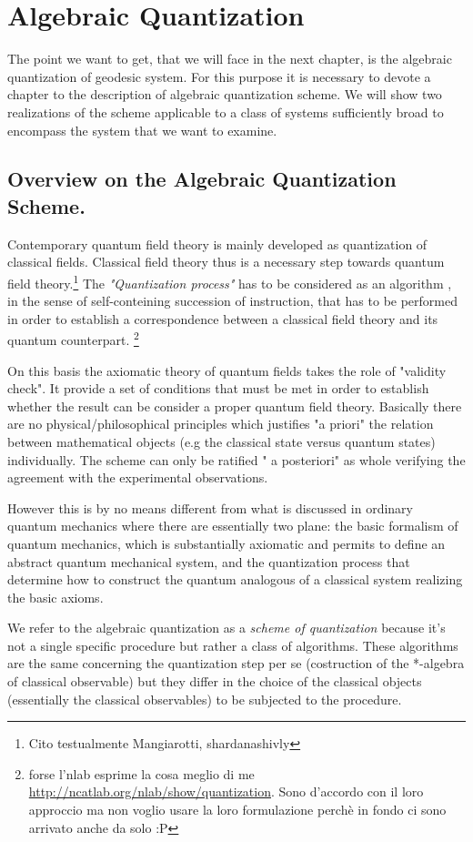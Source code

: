 \documentclass[Main]{subfiles}
\begin{document}
\chapter{Algebraic Quantization}
The point we want to get, that we will face in the next chapter, is the algebraic quantization of geodesic system.
For this purpose it is necessary to devote a chapter to the description of algebraic quantization scheme.
We will show two realizations of the scheme applicable to a class of systems sufficiently broad to encompass the system that we want to examine.

\section{Overview on the Algebraic Quantization Scheme.}
Contemporary quantum field theory is mainly developed as quantization of classical fields. Classical field theory thus is a necessary step towards quantum field theory.\danger \footnote{Cito testualmente Mangiarotti, shardanashivly}
The \emph{"Quantization process"} has to be considered as an algorithm , in the sense of self-conteining succession of instruction, that has to be performed in order to establish a correspondence between a classical field theory and its quantum counterpart.
\danger\footnote{forse l'nlab esprime la cosa meglio di me \url{http://ncatlab.org/nlab/show/quantization}. Sono d'accordo con il loro approccio ma non voglio usare la loro formulazione perchè in fondo ci sono arrivato anche da solo :P}

On this basis the axiomatic theory of quantum fields takes the role of "validity check". It provide a set of conditions that must be met in order to establish whether the result can be consider a proper quantum field theory.
Basically there are no physical/philosophical principles which justifies "a priori" the relation between mathematical objects (e.g the classical state versus quantum states) individually. The scheme can only be ratified " a posteriori" as whole verifying the agreement with the experimental observations.

However this is by no means different from what is discussed in ordinary quantum mechanics where there are essentially two plane:
the basic formalism of quantum mechanics, which is substantially axiomatic and permits to define an abstract quantum mechanical system, and the quantization process that determine how to construct the quantum analogous of a classical system realizing the basic axioms.

We refer to the algebraic quantization as a \emph{scheme of quantization} because it's not a single specific procedure but rather a class of algorithms.
These algorithms are the same concerning the quantization step per se (costruction of the *-algebra of classical observable) but they differ in the choice of the classical objects  (essentially the classical observables) to be subjected to the procedure.
\end{document}
